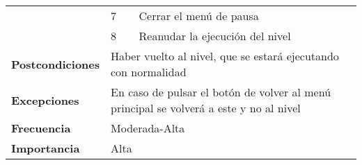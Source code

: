 \begin{longtable}{lll}
\multicolumn{1}{l|}{}                            & 7                         & Cerrar el menú de pausa                                                        \\
\multicolumn{1}{l|}{}                            & 8                         & Reanudar la ejecución del nivel                                                \\ \hline
\textbf{Postcondiciones}                         & \multicolumn{2}{l}{Haber vuelto al nivel, que se estará ejecutando con normalidad}                         \\ \hline
\textbf{Excepciones}                             & \multicolumn{2}{l}{En caso de pulsar el botón de volver al menú principal se volverá a este y no al nivel} \\ \hline
\textbf{Frecuencia}                              & \multicolumn{2}{l}{Moderada-Alta}                                                                          \\ \hline
\textbf{Importancia}                             & \multicolumn{2}{l}{Alta}                                                                                   \\ \hline
\end{longtable}

